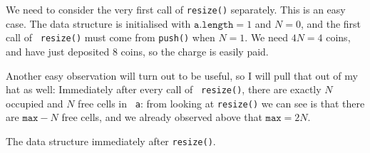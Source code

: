 \documentclass{tufte-handout}
\begin{document}
We need to consider the very first call of {\tt resize()}
separately. This is an easy case. The data structure is initialised
with $\mathtt{a.length}=1$ and $N=0$, and the first call of {\tt
  resize()} must come from {\tt push()} when $N=1$. We need $4N=4$
coins, and have just deposited $8$ coins, so the charge is easily paid.

Another easy observation will turn out to be useful, so I will pull
that out of my hat as well:
 Immediately after every call of {\tt
  resize()}, there are exactly $N$ occupied and $N$ free cells in {\tt
  a}: from looking at {\tt resize()} we can see is that there are
$\mathtt{max}-N$ free cells, and we already observed above that
$\mathtt{max}=2N$.
\begin{marginfigure}
  \caption{The data structure immediately after {\tt resize()}.}
\end{marginfigure}
\end{document}
